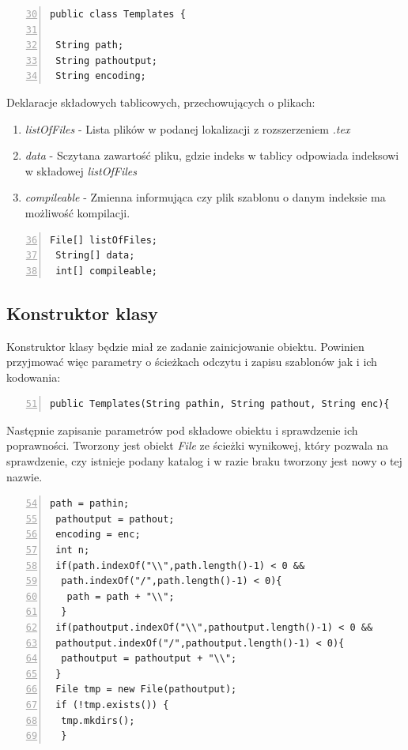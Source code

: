 \begin{lstlisting}[numbers=left,firstnumber=30]
public class Templates {
    
 String path; 
 String pathoutput;
 String encoding;
  \end{lstlisting}
  
Deklaracje składowych tablicowych, przechowujących o plikach:
    \begin{enumerate}
    \item \emph{listOfFiles} - Lista plików w podanej lokalizacji z rozszerzeniem \emph{.tex}
    \item \emph{data}  - Sczytana zawartość pliku, gdzie indeks w tablicy odpowiada indeksowi w składowej \emph{listOfFiles}
    \item \emph{compileable} - Zmienna informująca czy plik szablonu o danym indeksie ma możliwość kompilacji.
     \end{enumerate}
  
  \begin{lstlisting}[numbers=left,firstnumber=36]
 File[] listOfFiles;
 String[] data;
 int[] compileable;
  \end{lstlisting}
  
\subsection{Konstruktor klasy}

Konstruktor klasy będzie miał ze zadanie zainicjowanie obiektu. Powinien przyjmować więc parametry o ścieżkach odczytu i zapisu szablonów jak i ich kodowania:

  \begin{lstlisting}[numbers=left,firstnumber=51]
 public Templates(String pathin, String pathout, String enc){
  \end{lstlisting}
  
  Następnie zapisanie parametrów pod składowe obiektu i sprawdzenie ich poprawności. Tworzony jest obiekt \emph{File} ze ścieżki wynikowej, który pozwala na sprawdzenie, czy istnieje podany katalog i w razie braku tworzony jest nowy o tej nazwie.
  
  \begin{lstlisting}[numbers=left,firstnumber=54]
 path = pathin;
 pathoutput = pathout;
 encoding = enc;
 int n;
 if(path.indexOf("\\",path.length()-1) < 0 && 
  path.indexOf("/",path.length()-1) < 0){
   path = path + "\\";
  }
 if(pathoutput.indexOf("\\",pathoutput.length()-1) < 0 &&
 pathoutput.indexOf("/",pathoutput.length()-1) < 0){
  pathoutput = pathoutput + "\\";
 }
 File tmp = new File(pathoutput);
 if (!tmp.exists()) {
  tmp.mkdirs();
  }
    \end{lstlisting}
    
